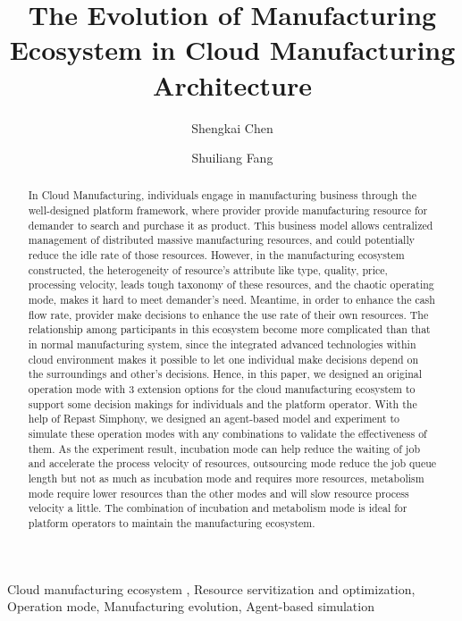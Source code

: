 
\title{The Evolution of Manufacturing Ecosystem in Cloud Manufacturing Architecture
}

\author[label1]{Shengkai Chen}
\author[label1]{Shuiliang Fang}
\address[label1]{Zhejiang University, Institute of manufacturing engineering and automation, Hangzhou City, Zhejiang Province, China}



\begin{abstract}
In Cloud Manufacturing, individuals engage in manufacturing business through the well-designed platform framework, where provider provide manufacturing resource for demander to search and purchase it as product. This business model allows centralized management of distributed massive manufacturing resources, and could potentially reduce the idle rate of those resources.
However, in the manufacturing ecosystem constructed, the heterogeneity of resource's attribute like type, quality, price, processing velocity, leads tough taxonomy of these resources, and the chaotic operating mode, makes it hard to meet demander's need. Meantime, in order to enhance the cash flow rate, provider make decisions to enhance the use rate of their own resources.
The relationship among participants in this ecosystem become more complicated than that in normal manufacturing system, since the integrated advanced technologies within cloud environment makes it possible to let one individual make decisions depend on the surroundings and other's decisions. Hence, in this paper, we designed an original operation mode with 3 extension options for the cloud manufacturing ecosystem to support some decision makings for individuals and the platform operator.
With the help of Repast Simphony, we designed an agent-based model and experiment to simulate these operation modes with any combinations to validate the effectiveness of them. As the experiment result, incubation mode can help reduce the waiting of job and accelerate the process velocity of resources, outsourcing mode reduce the job queue length but not as much as incubation mode and requires more resources, metabolism mode require lower resources than the other modes and will slow resource process velocity a little. The combination of incubation and metabolism mode is ideal for platform operators to maintain the manufacturing ecosystem.
\end{abstract}

\begin{keyword}
Cloud manufacturing ecosystem \sep
Resource servitization and optimization\sep
Operation mode\sep
Manufacturing evolution\sep
Agent-based simulation

\end{keyword}
